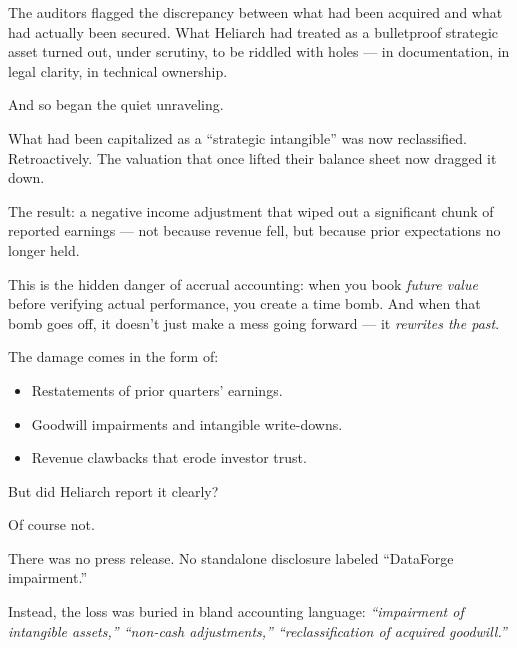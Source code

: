 The auditors flagged the discrepancy between what had been acquired and what had actually been secured. What Heliarch had treated as a bulletproof strategic asset turned out, under scrutiny, to be riddled with holes — in documentation, in legal clarity, in technical ownership.

And so began the quiet unraveling.

What had been capitalized as a “strategic intangible” was now reclassified. Retroactively. The valuation that once lifted their balance sheet now dragged it down.

The result: a negative income adjustment that wiped out a significant chunk of reported earnings — not because revenue fell, but because prior expectations no longer held.

This is the hidden danger of accrual accounting:
when you book \textit{future value} before verifying actual performance, you create a time bomb.
And when that bomb goes off, it doesn’t just make a mess going forward — it \textit{rewrites the past}.

The damage comes in the form of:

\begin{itemize}
\item Restatements of prior quarters’ earnings.
\item Goodwill impairments and intangible write-downs.
\item Revenue clawbacks that erode investor trust.
\end{itemize}

But did Heliarch report it clearly?

Of course not.

There was no press release. No standalone disclosure labeled “DataForge impairment.”

Instead, the loss was buried in bland accounting language:
\textit{“impairment of intangible assets,” “non-cash adjustments,” “reclassification of acquired goodwill.”}

